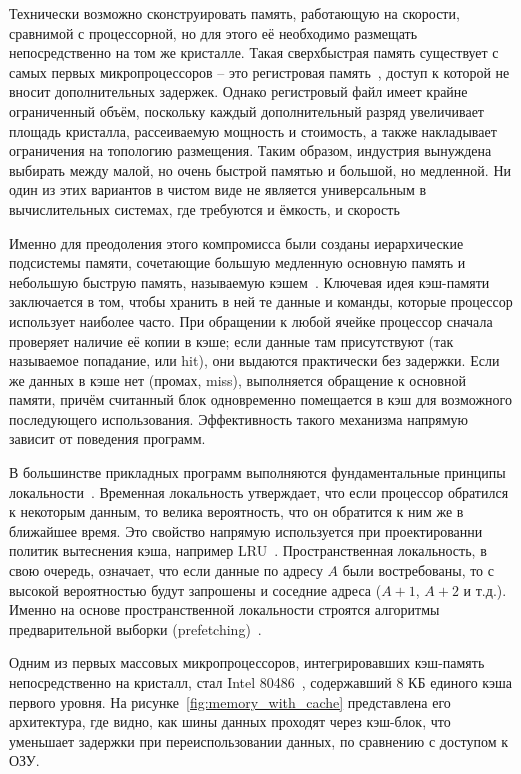 Технически возможно сконструировать память, работающую на скорости,
сравнимой с процессорной, но для этого её необходимо размещать
непосредственно на том же кристалле.
Такая сверхбыстрая память существует с самых первых микропроцессоров
-- это регистровая память~\cite{yu2011sram}, доступ к которой не
вносит дополнительных задержек.
Однако регистровый файл имеет крайне ограниченный объём, поскольку
каждый дополнительный разряд увеличивает площадь кристалла,
рассеиваемую мощность и стоимость, а также накладывает
ограничения на топологию размещения.
Таким образом, индустрия вынуждена выбирать между малой, но очень
быстрой памятью и большой, но медленной.
Ни один из этих вариантов в чистом виде не является универсальным
в вычислительных системах, где требуются и ёмкость, и скорость

Именно для преодоления этого компромисса были созданы иерархические
подсистемы памяти, сочетающие большую медленную основную память и
небольшую быструю память, называемую кэшем~\cite{cache}.
Ключевая идея кэш-памяти заключается в том, чтобы хранить в ней те
данные и команды, которые процессор использует наиболее часто. При
обращении к любой ячейке процессор сначала проверяет наличие её копии
в кэше; если данные там присутствуют (так называемое попадание, или
hit), они выдаются практически без задержки. Если же данных в кэше
нет (промах, miss), выполняется обращение к основной памяти, причём
считанный блок одновременно помещается в кэш для возможного
последующего использования. Эффективность такого механизма напрямую
зависит от поведения программ.

В большинстве прикладных программ выполняются фундаментальные
принципы локальности~\cite{spatio-temp}.
Временная локальность утверждает, что если процессор обратился к
некоторым данным, то велика вероятность, что он обратится к ним же в
ближайшее время.
Это свойство напрямую используется при проектированни политик
вытеснения кэша, например LRU~\cite{cache-alg}.
Пространственная локальность, в свою очередь, означает, что если
данные по адресу $A$
были востребованы, то с высокой вероятностью будут запрошены и
соседние адреса ($A+1$, $A+2$ и т.д.).
Именно на основе пространственной локальности строятся алгоритмы
предварительной выборки (prefetching)~\cite{prefetch,
mittal2016survey}.

Одним из первых массовых микропроцессоров, интегрировавших кэш-память
непосредственно на кристалл, стал Intel 80486~\cite{brey2009intel},
содержавший 8 КБ единого кэша первого уровня.
На рисунке~\ref{fig:memory_with_cache} представлена его архитектура,
где видно, как шины данных проходят через кэш-блок, что уменьшает
задержки при переиспользовании данных, по сравнению с доступом к ОЗУ.

